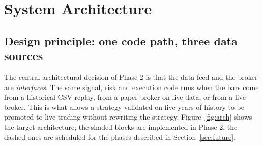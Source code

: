 \documentclass[11pt,a4paper]{article}
\begin{document}
\section{System Architecture}\label{sec:arch}

\subsection{Design principle: one code path, three data sources}

The central architectural decision of Phase 2 is that the data feed and the broker are
\emph{interfaces}. The same signal, risk and execution code runs when the bars come from
a historical CSV replay, from a paper broker on live data, or from a live broker. This
is what allows a strategy validated on five years of history to be promoted to live
trading without rewriting the strategy. Figure~\ref{fig:arch} shows the target
architecture; the shaded blocks are implemented in Phase 2, the dashed ones are
scheduled for the phases described in Section~\ref{sec:future}.
\end{document}
